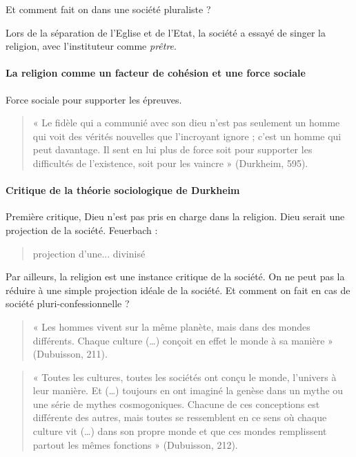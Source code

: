 Et comment fait on dans une société pluraliste ?
\begin{Ex}
Lors de la séparation de l'Eglise et de l'Etat, la société a essayé de singer la religion, avec l'instituteur comme \textit{prêtre}.
\end{Ex}

\paragraph{La religion comme un facteur de cohésion et une force sociale } Force sociale pour supporter les épreuves.
\begin{quote}
    « Le fidèle qui a communié avec son dieu n’est pas seulement un homme qui voit des vérités nouvelles que l’incroyant ignore ; c’est un homme qui peut davantage. Il sent en lui plus de force soit pour supporter les difficultés de l’existence, soit pour les vaincre » (Durkheim, 595).  
\end{quote}

\paragraph{Critique de la théorie sociologique de Durkheim } Première critique, Dieu n'est pas pris en charge dans la religion. Dieu serait une projection de la société. Feuerbach : 
\begin{quote}
    projection d'une... divinisé
\end{quote}

Par ailleurs, la religion est une instance critique de la société. On ne peut pas la réduire à une simple projection idéale de la société. Et comment on fait en cas de société pluri-confessionnelle ?


\begin{quote}
    « Les hommes vivent sur la même planète, mais dans des mondes différents. Chaque culture (…) conçoit en effet le monde à sa manière » (Dubuisson, 211). 
\end{quote}

\begin{quote}
    « Toutes les cultures, toutes les sociétés ont conçu le monde, l’univers à leur manière. Et (…) toujours en ont imaginé la genèse dans un mythe ou une série de mythes cosmogoniques. Chacune de ces conceptions est différente des autres, mais toutes se ressemblent en ce sens où chaque culture vit (…) dans son propre monde et que ces mondes remplissent partout les mêmes fonctions » (Dubuisson, 212). 
\end{quote}

